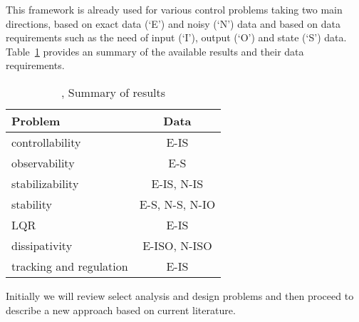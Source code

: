 This framework is already used for various control problems taking two main directions, based on exact data (`E') and noisy (`N') data and based on data requirements such as the need of input (`I'), output (`O') and state (`S') data.
Table~\ref{tab:summary} provides an summary of the available results and their data requirements.


\begin{table}[H]  
\begin{center}
{\small\begin{tabular}{l|c}
Problem & Data\\
\hline
{controllability} & E-IS\\
observability & E-S\\
{stabilizability} & E-IS, N-IS\\
stability & E-S, N-S, N-IO\\
{LQR} & E-IS\\
{dissipativity} & E-ISO, N-ISO\\
{tracking and regulation} & E-IS\\
\end{tabular}}
\end{center}
\caption{\cite{vanwaarde2023informativity}, Summary of results}
\label{tab:summary}
\end{table}
Initially we will review select analysis and design problems and then proceed to describe a new approach based on current literature.


